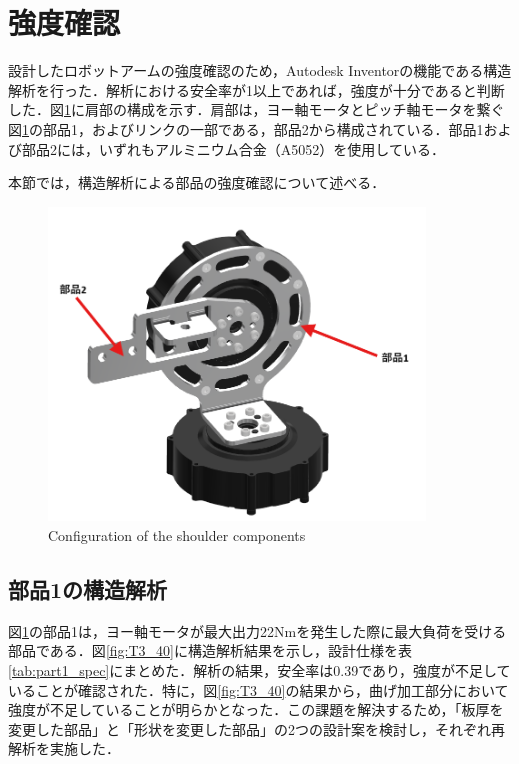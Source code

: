 \section{強度確認}
設計したロボットアームの強度確認のため，Autodesk Inventorの機能である構造解析を行った．解析における安全率が1以上であれば，強度が十分であると判断した．図\ref{fig:shoulder}に肩部の構成を示す．肩部は，ヨー軸モータとピッチ軸モータを繋ぐ図\ref{fig:shoulder}の部品1，およびリンクの一部である，部品2から構成されている．部品1および部品2には，いずれもアルミニウム合金（A5052）を使用している．

本節では，構造解析による部品の強度確認について述べる．

\begin{figure}[h]
  \centering
  \includegraphics[width=10cm]{images/design/shoulder.png}
  \caption{Configuration of the shoulder components}
  \label{fig:shoulder}
\end{figure}

\subsection{部品1の構造解析}
図\ref{fig:shoulder}の部品1は，ヨー軸モータが最大出力22Nmを発生した際に最大負荷を受ける部品である．図\ref{fig:T3_40}に構造解析結果を示し，設計仕様を表\ref{tab:part1_spec}にまとめた．解析の結果，安全率は0.39であり，強度が不足していることが確認された．特に，図\ref{fig:T3_40}の結果から，曲げ加工部分において強度が不足していることが明らかとなった．この課題を解決するため，「板厚を変更した部品」と「形状を変更した部品」の2つの設計案を検討し，それぞれ再解析を実施した．

